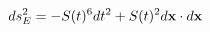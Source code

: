 \begin{equation}
\label{eq. Emetric}
ds_{E}^{2}=-S(t)^{6}dt^{2}+S(t)^{2}d{\bf x}\cdot d{\bf x}
\end{equation}

